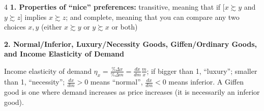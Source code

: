\documentclass[8pt,landscape]{extarticle}
\begin{document}
\begin{multicols}{4}
\textbf{1. Properties of ``nice'' preferences:} transitive, meaning that if $[x \succsim y$ and $y \succsim z]$ implies $x \succsim z$; and complete, meaning that you can compare any two choices $x,y$ (either $x \succsim y$ or $y \succsim x$ or both)

\textbf{2. Normal/Inferior, Luxury/Necessity Goods, Giffen/Ordinary Goods, and Income Elasticity of Demand}

Income elasticity of demand $\eta_x = \frac{\%\Delta x}{\%\Delta m} = \frac{dx}{dm}\frac{m}{x}$; if bigger than 1, ``luxury''; smaller than 1, ``necessity''; $\frac{dx}{dm} > 0$ means ``normal'', $\frac{dx}{dm} < 0$ means inferior. A Giffen good is one where demand increases as price increases (it is necessarily an inferior good).

\end{multicols}
\end{document}
